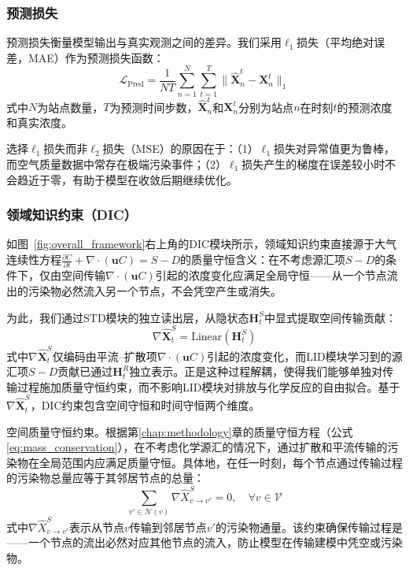\subsubsection{预测损失}

预测损失衡量模型输出与真实观测之间的差异。我们采用$\ell_1$损失（平均绝对误差，MAE）作为预测损失函数：
\begin{equation}
    \mathcal{L}_{\mathrm{Pred}} = \frac{1}{NT} \sum_{n=1}^{N} \sum_{t=1}^{T} \|\hat{\mathbf{X}}_n^t - \mathbf{X}_n^t\|_1
\label{eq:pred_loss}
\end{equation}
\noindent 式中$N$为站点数量，$T$为预测时间步数，$\hat{\mathbf{X}}_n^t$和$\mathbf{X}_n^t$分别为站点$n$在时刻$t$的预测浓度和真实浓度。

选择$\ell_1$损失而非$\ell_2$损失（MSE）的原因在于：（1）$\ell_1$损失对异常值更为鲁棒，而空气质量数据中常存在极端污染事件；（2）$\ell_1$损失产生的梯度在误差较小时不会趋近于零，有助于模型在收敛后期继续优化。

\subsubsection{领域知识约束（DIC）}

如图~\ref{fig:overall_framework}右上角的DIC模块所示，领域知识约束直接源于大气连续性方程$\frac{\partial C}{\partial t} + \nabla \cdot (\mathbf{u}C) = S - D$的质量守恒含义：在不考虑源汇项$S-D$的条件下，仅由空间传输$\nabla \cdot (\mathbf{u}C)$引起的浓度变化应满足全局守恒——从一个节点流出的污染物必然流入另一个节点，不会凭空产生或消失。

为此，我们通过STD模块的独立读出层，从隐状态$\mathbf{H}_t^S$中显式提取空间传输贡献：
\begin{equation}
    \nabla \hat{\mathbf{X}}_t^S = \text{Linear}(\mathbf{H}_t^S)
\label{eq:transport_contribution}
\end{equation}
\noindent 式中$\nabla \hat{\mathbf{X}}_t^S$仅编码由平流--扩散项$\nabla \cdot (\mathbf{u}C)$引起的浓度变化，而LID模块学习到的源汇项$S-D$贡献已通过$\mathbf{H}_t^R$独立表示。正是这种过程解耦，使得我们能够单独对传输过程施加质量守恒约束，而不影响LID模块对排放与化学反应的自由拟合。基于$\nabla \hat{\mathbf{X}}_t^S$，DIC约束包含空间守恒和时间守恒两个维度。

空间质量守恒约束。根据第\ref{chap:methodology}章的质量守恒方程（公式\eqref{eq:mass_conservation}），在不考虑化学源汇的情况下，通过扩散和平流传输的污染物在全局范围内应满足质量守恒。具体地，在任一时刻，每个节点通过传输过程的污染物总量应等于其邻居节点的总量：
\begin{equation}
    \sum_{v' \in \mathcal{N}(v)} \nabla \hat{X}_{v \to v'}^S = 0, \quad \forall v \in \mathcal{V}
\label{eq:spatial_conservation}
\end{equation}
\noindent 式中$\nabla \hat{X}_{v \to v'}^S$表示从节点$v$传输到邻居节点$v'$的污染物通量。该约束确保传输过程是——一个节点的流出必然对应其他节点的流入，防止模型在传输建模中凭空或污染物。

